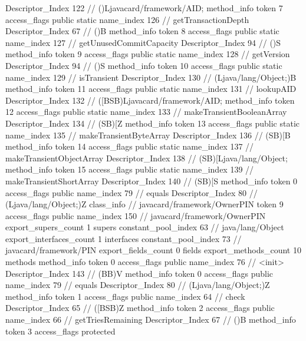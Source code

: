 {{{{{					Descriptor_Index	122		// ()Ljavacard/framework/AID;
				}
				method_info {
					token	7
					access_flags	public static
					name_index	126		// getTransactionDepth
					Descriptor_Index	67		// ()B
				}
				method_info {
					token	8
					access_flags	public static
					name_index	127		// getUnusedCommitCapacity
					Descriptor_Index	94		// ()S
				}
				method_info {
					token	9
					access_flags	public static
					name_index	128		// getVersion
					Descriptor_Index	94		// ()S
				}
				method_info {
					token	10
					access_flags	public static
					name_index	129		// isTransient
					Descriptor_Index	130		// (Ljava/lang/Object;)B
				}
				method_info {
					token	11
					access_flags	public static
					name_index	131		// lookupAID
					Descriptor_Index	132		// ([BSB)Ljavacard/framework/AID;
				}
				method_info {
					token	12
					access_flags	public static
					name_index	133		// makeTransientBooleanArray
					Descriptor_Index	134		// (SB)[Z
				}
				method_info {
					token	13
					access_flags	public static
					name_index	135		// makeTransientByteArray
					Descriptor_Index	136		// (SB)[B
				}
				method_info {
					token	14
					access_flags	public static
					name_index	137		// makeTransientObjectArray
					Descriptor_Index	138		// (SB)[Ljava/lang/Object;
				}
				method_info {
					token	15
					access_flags	public static
					name_index	139		// makeTransientShortArray
					Descriptor_Index	140		// (SB)[S
				}
				method_info {
					token	0
					access_flags	public
					name_index	79		// equals
					Descriptor_Index	80		// (Ljava/lang/Object;)Z
				}
			}
		}
		class_info {		// javacard/framework/OwnerPIN
			token	9
			access_flags	public
			name_index	150		// javacard/framework/OwnerPIN
			export_supers_count	1
			supers {
				constant_pool_index	63		// java/lang/Object
			}
			export_interfaces_count	1
			interfaces {
				constant_pool_index	73		// javacard/framework/PIN
			}
			export_fields_count	0
			fields {
			}
			export_methods_count	10
			methods {
				method_info {
					token	0
					access_flags	public
					name_index	76		// <init>
					Descriptor_Index	143		// (BB)V
				}
				method_info {
					token	0
					access_flags	public
					name_index	79		// equals
					Descriptor_Index	80		// (Ljava/lang/Object;)Z
				}
				method_info {
					token	1
					access_flags	public
					name_index	64		// check
					Descriptor_Index	65		// ([BSB)Z
				}
				method_info {
					token	2
					access_flags	public
					name_index	66		// getTriesRemaining
					Descriptor_Index	67		// ()B
				}
				method_info {
					token	3
					access_flags	protected
}}}}}
